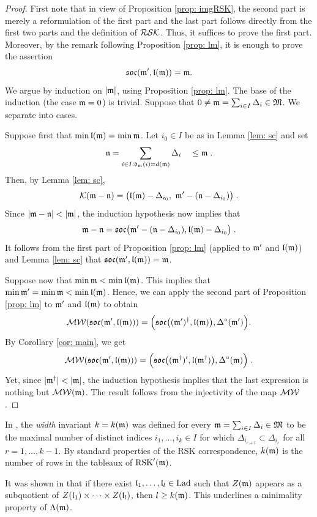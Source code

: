 \documentclass{ert-l} %
\begin{document}
\begin{proof}
First note that in view of Proposition \ref{prop: imgRSK}, the second part is merely a reformulation of the first part
and the last part follows directly from the first two parts and the definition of $\mathcal{RSK}$.
Thus, it suffices to prove the first part.
Moreover, by the remark following Proposition \ref{prop: lm}, it is enough to prove the assertion
\[
\mathfrak{soc}(\mathfrak{m}',\mathfrak{l}(\mathfrak{m}))=\mathfrak{m}.
\]
We argue by induction on $|\mathfrak{m}|$, using Proposition \ref{prop: lm}.
The base of the induction (the case $\mathfrak{m}=0$) is trivial.
Suppose that $0\neq \mathfrak{m} = \sum_{i\in I} \Delta_i\in\mathfrak{M}$. We separate into cases.

Suppose first that $\min\mathfrak{l}(\mathfrak{m})=\min\mathfrak{m}$.
Let $i_0\in I$ be as in Lemma \ref{lem: sc} and set
\[
\mathfrak{n}= \sum_{i\in I:\mathfrak{d}_{\mathfrak{m}}(i)=d(\mathfrak{m})}\Delta_i \quad\leq \mathfrak{m}\;.
\]
Then, by Lemma \ref{lem: sc},
\[
\mathcal{K}(\mathfrak{m}-\mathfrak{n}) = \big(\mathfrak{l}(\mathfrak{m})-\Delta_{i_0}, \    \mathfrak{m}' - (\mathfrak{n}-\Delta_{i_0})\big)\;.
\]
Since $|\m-\n|<|\m|$, the induction hypothesis now implies that
\[
\mathfrak{m}-\mathfrak{n} = \mathfrak{soc} \big( \mathfrak{m}' - (\mathfrak{n}-\Delta_{i_0}), \mathfrak{l}(\mathfrak{m})-\Delta_{i_0}\big) \;.
\]
It follows from the first part of Proposition \ref{prop: lm} (applied to $\mathfrak{m}'$ and $\mathfrak{l}(\mathfrak{m})$)
and Lemma \ref{lem: sc} that $\mathfrak{soc}(\mathfrak{m}', \mathfrak{l}(\mathfrak{m})) = \mathfrak{m}$.


Suppose now that $\min\mathfrak{m}<\min\mathfrak{l}(\mathfrak{m})$. This implies that $\min\mathfrak{m}'=\min\mathfrak{m}<\min\mathfrak{l}(\mathfrak{m})$.
Hence, we can apply the second part of Proposition \ref{prop: lm} to $\mathfrak{m}'$ and $\mathfrak{l}(\mathfrak{m})$ to obtain
\[
\mathcal{MW}(\mathfrak{soc}(\mathfrak{m}',\mathfrak{l}(\mathfrak{m}))) =  \Big(\mathfrak{soc}\big((\mathfrak{m}')^{\dagger}, \mathfrak{l}(\mathfrak{m})\big) , \Delta^{\circ}(\mathfrak{m}')\Big).
\]
By Corollary \ref{cor: main}, we get
\[
\mathcal{MW}(\mathfrak{soc}(\mathfrak{m}',\mathfrak{l}(\mathfrak{m}))) = \Big(\mathfrak{soc}\big((\mathfrak{m}^{\dagger})', \mathfrak{l}(\mathfrak{m}^{\dagger})\big) , \Delta^{\circ}(\mathfrak{m})\Big)\;.
\]
Yet, since $|\m^{\MWn}|<|\m|$, the induction hypothesis implies that the last expression is nothing but $\mathcal{MW}(\mathfrak{m})$.
The result follows from the injectivity of the map $\mathcal{MW}$.
\end{proof}

\begin{remark}
In \cite{10.1093/imrn/rnz006}, the \textit{width} invariant $k=k(\mathfrak{m})$ was defined for every $\mathfrak{m} = \sum_{i\in I} \Delta_i\in \mathfrak{M}$
to be the maximal number of distinct indices $i_1,\dots,i_k\in I$ for which
$\Delta_{i_{r+1}}\subset\Delta_{i_r}$ for all $r=1,\dots,k-1$.
By standard properties of the RSK correspondence, $k(\mathfrak{m})$ is the number of rows in the tableaux of $\operatorname{RSK}'(\mathfrak{m})$.

It was shown in \cite{10.1093/imrn/rnz006} that if there exist $\mathfrak{l}_1,\ldots,\mathfrak{l}_l\in \operatorname{Lad}$ such that
$Z(\mathfrak{m})$ appears as a subquotient of $Z(\mathfrak{l}_1)\times\dots\times Z(\mathfrak{l}_l)$, then $l \geq k(\mathfrak{m})$.
This underlines a minimality property of $\Lambda(\mathfrak{m})$.
\end{remark}
\end{document}
